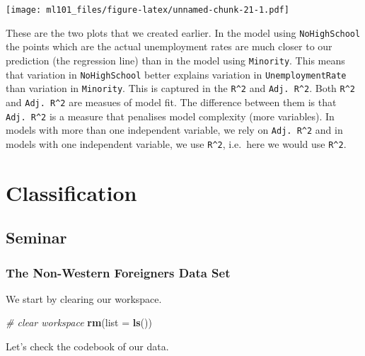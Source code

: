 \documentclass[]{article}
\newenvironment{Shaded}{\begin{snugshade}}{\end{snugshade}}
\newcommand{\CommentTok}[1]{\textcolor[rgb]{0.56,0.35,0.01}{\textit{#1}}}
\newcommand{\DataTypeTok}[1]{\textcolor[rgb]{0.13,0.29,0.53}{#1}}
\newcommand{\KeywordTok}[1]{\textcolor[rgb]{0.13,0.29,0.53}{\textbf{#1}}}
\newcommand{\NormalTok}[1]{#1}
\begin{document}
\texttt{[image: ml101\_files/figure-latex/unnamed-chunk-21-1.pdf]}

These are the two plots that we created earlier. In the model using \texttt{NoHighSchool} the points which are the actual unemployment rates are much closer to our prediction (the regression line) than in the model using \texttt{Minority}. This means that variation in \texttt{NoHighSchool} better explains variation in \texttt{UnemploymentRate} than variation in \texttt{Minority}. This is captured in the \texttt{R\^{}2} and \texttt{Adj.\ R\^{}2}. Both \texttt{R\^{}2} and \texttt{Adj.\ R\^{}2} are measues of model fit. The difference between them is that \texttt{Adj.\ R\^{}2} is a measure that penalises model complexity (more variables). In models with more than one independent variable, we rely on \texttt{Adj.\ R\^{}2} and in models with one independent variable, we use \texttt{R\^{}2}, i.e.~here we would use \texttt{R\^{}2}.

\hypertarget{classification}{%
\section{Classification}\label{classification}}

\hypertarget{seminar}{%
\subsection{Seminar}\label{seminar}}

\hypertarget{the-non-western-foreigners-data-set}{%
\subsubsection{The Non-Western Foreigners Data Set}\label{the-non-western-foreigners-data-set}}

We start by clearing our workspace.

\begin{Shaded}
\begin{Highlighting}[]
\CommentTok{# clear workspace}
\KeywordTok{rm}\NormalTok{(}\DataTypeTok{list =} \KeywordTok{ls}\NormalTok{())}
\end{Highlighting}
\end{Shaded}

Let's check the codebook of our data.
\end{document}
